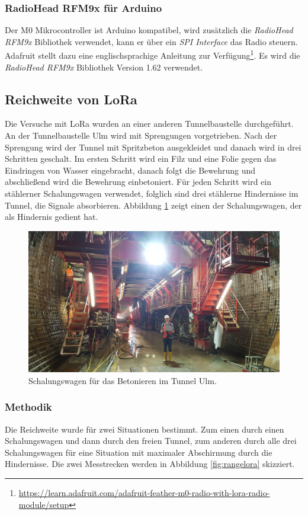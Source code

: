 \subsubsection{RadioHead RFM9x für Arduino}
Der M0 Mikrocontroller ist Arduino kompatibel, wird zusätzlich die \emph{RadioHead RFM9x} Bibliothek verwendet, kann er über ein \emph{SPI Interface} das Radio steuern.
Adafruit stellt dazu eine englischsprachige Anleitung zur Verfügung\footnote{\url{https://learn.adafruit.com/adafruit-feather-m0-radio-with-lora-radio-module/setup}}.
Es wird die \emph{RadioHead RFM9x} Bibliothek Version 1.62 verwendet.

\subsection{Reichweite von LoRa}
Die Versuche mit LoRa wurden an einer anderen Tunnelbaustelle durchgeführt.
An der Tunnelbaustelle Ulm wird mit Sprengungen vorgetrieben.
Nach der Sprengung wird der Tunnel mit Spritzbeton ausgekleidet und danach wird in drei Schritten geschalt. 
Im ersten Schritt wird ein Filz und eine Folie gegen das Eindringen von Wasser eingebracht, danach folgt die Bewehrung und abschließend wird die Bewehrung einbetoniert.
Für jeden Schritt wird ein stählerner Schalungswagen verwendet, folglich sind drei stählerne Hindernisse im Tunnel, die Signale absorbieren.
Abbildung \ref{fig:schalungswagen} zeigt einen der Schalungswagen, der als Hindernis gedient hat.

\begin{figure}[h]
  \centering
	\includegraphics[width=\textwidth]{images/schalungswagen.jpg}
  \caption{Schalungswagen für das Betonieren im Tunnel Ulm.}
  \label{fig:schalungswagen}
\end{figure}

\subsubsection{Methodik} 
Die Reichweite wurde für zwei Situationen bestimmt.
Zum einen durch einen Schalungswagen und dann durch den freien Tunnel, zum anderen durch alle drei Schalungswagen für eine Situation mit maximaler Abschirmung durch die Hindernisse.
Die zwei Messtrecken werden in Abbildung \ref{fig:rangelora} skizziert.

